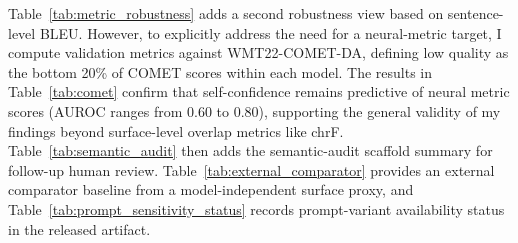 \documentclass[10pt,conference]{IEEEtran}
\begin{document}


Table~\ref{tab:metric_robustness} adds a second robustness view based on sentence-level BLEU. However, to explicitly address the need for a neural-metric target, I compute validation metrics against WMT22-COMET-DA, defining low quality as the bottom 20\% of COMET scores within each model. The results in Table~\ref{tab:comet} confirm that self-confidence remains predictive of neural metric scores (AUROC ranges from 0.60 to 0.80), supporting the general validity of my findings beyond surface-level overlap metrics like chrF. Table~\ref{tab:semantic_audit} then adds the semantic-audit scaffold summary for follow-up human review. Table~\ref{tab:external_comparator} provides an external comparator baseline from a model-independent surface proxy, and Table~\ref{tab:prompt_sensitivity_status} records prompt-variant availability status in the released artifact.


\end{document}
